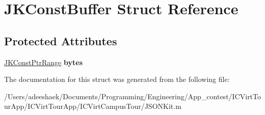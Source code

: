 \hypertarget{struct_j_k_const_buffer}{\section{J\-K\-Const\-Buffer Struct Reference}
\label{struct_j_k_const_buffer}
}
\subsection*{Protected Attributes}
\begin{DoxyCompactItemize}
\item 
\hypertarget{struct_j_k_const_buffer_aba77cdbd963a9ef7df9a3925a3d4a52c}{\hyperlink{struct_j_k_const_ptr_range}{J\-K\-Const\-Ptr\-Range} {\bfseries bytes}}\label{struct_j_k_const_buffer_aba77cdbd963a9ef7df9a3925a3d4a52c}

\end{DoxyCompactItemize}


The documentation for this struct was generated from the following file\-:\begin{DoxyCompactItemize}
\item 
/\-Users/adeeshaek/\-Documents/\-Programming/\-Engineering/\-App\-\_\-contest/\-I\-C\-Virt\-Tour\-App/\-I\-C\-Virt\-Tour\-App/\-I\-C\-Virt\-Campus\-Tour/J\-S\-O\-N\-Kit.\-m\end{DoxyCompactItemize}
